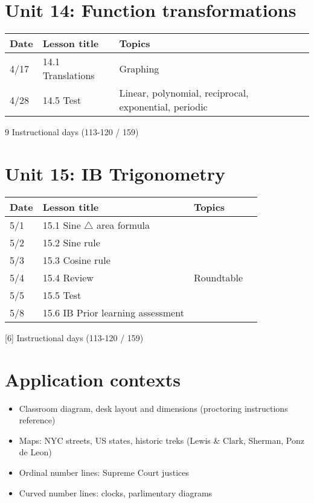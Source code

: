 \section*{Unit 14: Function transformations}
\begin{tabular}{|p{0.9cm}|p{4cm}|p{7cm}|p{5cm}|}
  \hline
  Date & Lesson title & Topics  &  \\
  \hline
  4/17 & 14.1 Translations & Graphing &  \\
  \hline
  4/28 & 14.5 Test & Linear, polynomial, reciprocal, exponential, periodic &  \\
  \hline


\end{tabular} \par \vspace*{0.3cm}
9 Instructional days (113-120 / 159)

\section*{Unit 15: IB Trigonometry}
\begin{tabular}{|p{0.9cm}|p{4cm}|p{7cm}|p{5cm}|}
  \hline
  Date & Lesson title & Topics  &  \\
  \hline
  5/1 & 15.1 Sine $\triangle$ area formula &  &  \\
  \hline
  5/2 & 15.2 Sine rule &  &  \\
  \hline
  5/3 & 15.3 Cosine rule &  &  \\
  \hline
  5/4 & 15.4 Review & Roundtable &  \\
  \hline
  5/5 & 15.5 Test &  &  \\
  \hline
  5/8 & 15.6 IB Prior learning assessment &  &  \\
  \hline

\end{tabular} \par \vspace*{0.3cm}
[6] Instructional days (113-120 / 159)


\newpage
\section*{Application contexts}
\begin{itemize}
  \item Classroom diagram, desk layout and dimensions (proctoring instructions reference)
  \item Maps: NYC streets, US states, historic treks (Lewis \& Clark, Sherman, Ponz de Leon)
  \item Ordinal number lines: Supreme Court justices
  \item Curved number lines: clocks, parlimentary diagrams
\end{itemize}

